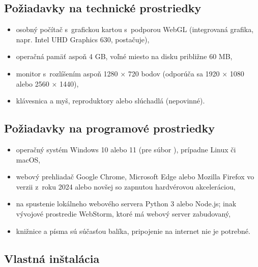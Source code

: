 \documentclass[11pt, a4paper]{article}
\begin{document}
\subsection{Požiadavky na technické prostriedky}

\begin{itemize}
  \item osobný počítač s~grafickou kartou s~podporou WebGL (integrovaná grafika, napr. Intel
    UHD Graphics 630, postačuje),
  \item operačná pamäť aspoň 4 GB, voľné miesto na disku približne 60 MB,
  \item monitor s~rozlíšením aspoň 1280 × 720 bodov (odporúča sa 1920 × 1080 alebo 2560 × 1440),
  \item klávesnica a myš, reproduktory alebo slúchadlá (nepovinné).
\end{itemize}

\subsection{Požiadavky na programové prostriedky}

\begin{itemize}
  \item operačný systém Windows 10 alebo 11 (pre súbor ), prípadne Linux či macOS,
  \item webový prehliadač Google Chrome, Microsoft Edge alebo Mozilla Firefox vo verzii z~roku
    2024 alebo novšej so zapnutou hardvérovou akceleráciou,
  \item na spustenie lokálneho webového servera Python 3 alebo Node.js; inak vývojové prostredie
    WebStorm, ktoré má webový server zabudovaný,
  \item knižnice a písma sú súčasťou balíka, pripojenie na internet nie je potrebné.
\end{itemize}

\subsection{Vlastná inštalácia}
\end{document}
